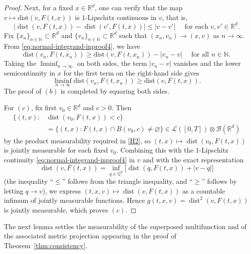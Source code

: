 \documentclass[11pt]{elsarticle}
\theoremstyle{definition}
\theoremstyle{remark}
\numberwithin{equation}{section}
\def\dist{\operatorname{dist}}
\begin{document}
\begin{proof}
		Next, for a fixed $x\in\mathbb{R}^d$, one can verify that the map $v \mapsto \text{dist}(v, F(t, x))$ is $1$-Lipschitz continuous in $v$, that is,
		\begin{equation}\label{eq:normal-integrand-inproof4}
			|\dist(v, F(t,x)) - \dist(v', F(t,x))| \le |v - v'|
			\quad \text{ for each } v,v'\in\mathbb{R}^d.
		\end{equation}
		Fix $\{x_n\}_{n\in\mathbb{N}}\subset\mathbb{R}^d$
		and $\{v_n\}_{n\in\mathbb{N}}\subset\mathbb{R}^d$
		such that $(x_n, v_n) \rightarrow (x, v)$ as $n \rightarrow \infty.$ From \eqref{eq:normal-integrand-inproof4}, we have
		\begin{equation}
			\text{dist}(v_n, F(t, x_n)) \ge \text{dist}(v, F(t, x_n)) - |v_n - v| \quad \text{ for all } n\in\mathbb{N}.
		\end{equation}
		Taking the $\liminf_{n \rightarrow \infty}$ on both sides, the term $|v_n - v|$ vanishes and the lower semicontinuity in $x$ for the first term on the right-hand side gives
		\begin{equation}
			\liminf_{n \rightarrow \infty} \text{dist}(v_n, F(t, x_n)) \ge \text{dist}(v, F(t, x)).
		\end{equation}
		The proof of $(b)$ is completed by squaring both sides.
		
		For $(c)$, fix first $v_0\in\mathbb{R}^d$ and
		$c>0$. Then
		\begin{align*}
		\bigl\{(t,x):&\dist(v_0,F(t,x))<c\bigr\}
		\\
		& =
		\bigl\{(t,x):F(t,x)\cap B(v_0,c)\neq\varnothing\bigr\}
		\in
		\mathscr{L}([0,T])\otimes\mathcal{B}(\mathbb{R}^d)
		\end{align*}
		by the product measurability required in \ref{H2}, so
		$(t,x)\mapsto\dist(v_0,F(t,x))$ is jointly measurable for each fixed
		$v_0$. Combining this with the $1$-Lipschitz continuity
		\eqref{eq:normal-integrand-inproof4} in $v$ and with the exact
		representation
		\[
		\dist(v,F(t,x))
		=
		\inf_{q\in\mathbb{Q}^d}
		\bigl[\dist(q,F(t,x))+|v-q|\bigr]
		\]
		(the inequality ``$\le$'' follows from the triangle inequality, and
		``$\ge$'' follows by letting $q\to v$), we express
		$(t,x,v)\mapsto\dist(v,F(t,x))$ as a countable infimum of jointly
		measurable functions. Hence $g(t,x,v)=\operatorname{dist}^2(v, F(t, x))$ is jointly measurable, which
		proves $(c)$.
	\end{proof}
	
	
	The next lemma settles the measurability of the superposed
	multifunction and of the associated metric projection appearing in the
	proof of Theorem~\ref{thm:consistency}.
	
\end{document}
